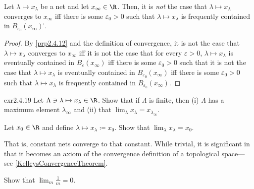 \begin{prp}{}{}
Let $\lambda \mapsto x_{\lambda}$ be a net and let $x_{\infty}\in \R$.  Then, it is \emph{not} the case that $\lambda \mapsto x_{\lambda}$ converges to $x_{\infty}$ iff there is some $\varepsilon _0>0$ such that $\lambda \mapsto x_{\lambda}$ is frequently contained in $B_{\varepsilon _0}(x_{\infty})^{\comp}$.
\begin{proof}
By \cref{prp2.4.12} and the definition of convergence, it is not the case that $\lambda \mapsto x_{\lambda}$ converges to $x_{\infty}$ iff it is not the case that for every $\varepsilon >0$, $\lambda \mapsto x_{\lambda}$ is eventually contained in $B_{\varepsilon}(x_{\infty})$ iff there is some $\varepsilon _0>0$ such that it is not the case that $\lambda \mapsto x_{\lambda}$ is eventually contained in $B_{\varepsilon _0}(x_{\infty})$ iff there is some $\varepsilon _0>0$ such that $\lambda \mapsto x_{\lambda}$ is frequently contained in $B_{\varepsilon _0}(x_{\infty})$.
\end{proof}
\end{prp}
\begin{exr}{}{exr2.4.19}
Let $\Lambda \ni \lambda \mapsto x_{\lambda}\in \R$.  Show that if $\Lambda$ is finite, then (i) $\Lambda$ has a maximum element $\lambda _{\infty}$ and (ii) that $\lim _{\lambda}x_{\lambda}=x_{\lambda _{\infty}}$.
\end{exr}
\begin{exr}{}{}
Let $x_0\in \R$ and define $\lambda \mapsto x_\lambda \coloneqq x_0$.  Show that $\lim _\lambda x_\lambda =x_0$.
\begin{rmk}
That is, constant nets converge to that constant.  While trivial, it is significant in that it becomes an axiom of the convergence definition of a topological space---see \cref{KelleysConvergenceTheorem}.
\end{rmk}
\end{exr}
\begin{exr}{}{}
Show that $\lim _m\frac{1}{m}=0$.
\end{exr}
